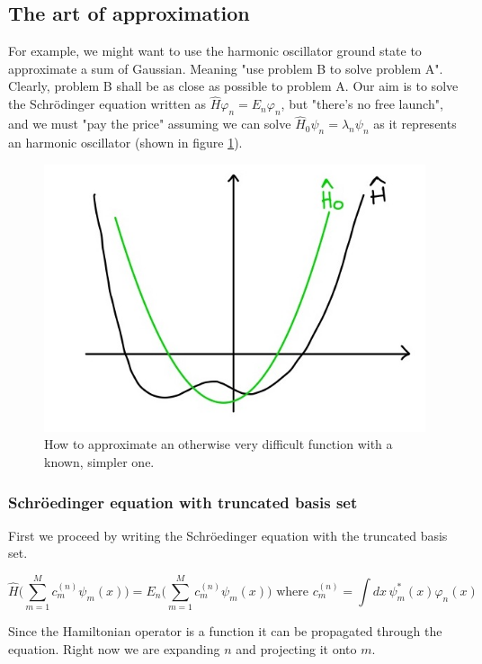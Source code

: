 	\subsection{The art of approximation}
	For example, we might want to use the harmonic oscillator ground state to approximate a sum of Gaussian.
	Meaning "use problem B to solve problem A".
	Clearly, problem B shall be as close as possible to problem A.
	Our aim is to solve the Schr{\"o}dinger equation written as $\hat{H}\varphi_n=E_n\varphi_n$, but "there's no free launch", and we must "pay the price" assuming we can solve $\hat{H}_0\psi_n=\lambda_n\psi_n$ as it represents an harmonic oscillator (shown in figure \ref{fig:approximation}).

	\begin{figure}[htbp!]
	\centering
	\includegraphics[scale=0.20]{img_1}
	\caption{How to approximate an otherwise very difficult function with a known, simpler one.}
	\label{fig:approximation}
	\end{figure}

		\subsubsection{Schr\"oedinger equation with truncated basis set}
		First we proceed by writing the Schr\"oedinger equation with the truncated basis set.

		$$\hat{H}\bigg(\sum_{m=1}^{M}c_m^{(n)}\psi_m(x)\bigg)=E_n\bigg(\sum_{m=1}^{M}c_m^{(n)}\psi_m(x)\bigg)\text{ where }c_m^{(n)}=\int dx\,\psi_m^*(x)\varphi_n(x)$$

		Since the Hamiltonian operator is a function it can be propagated through the equation.
		Right now we are expanding $n$ and projecting it onto $m$.

